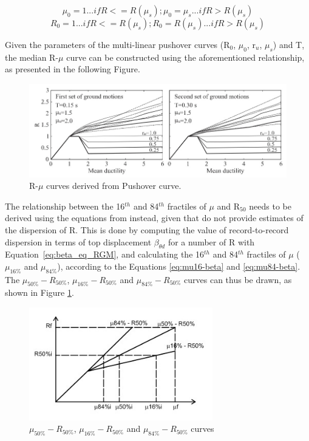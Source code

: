 \begin{equation}
\mu_0= 1 ... if R<=R(\mu_s); \mu_0 = \mu_s ... if R>R(\mu_s)
\end{equation}
\begin{equation}
R_0= 1 ... if R<=R(\mu_s); R_0 = R(\mu_s) ... if R>R(\mu_s)
\end{equation}

Given the parameters of the multi-linear pushover curves (R$_{0}$, $\mu_{0}$, r$_{u}$, $\mu_s$) and T, the median R-$\mu$ curve can be constructed using the aforementioned relationship, as presented in the following Figure.

\begin{figure}[!htbp]
\centering
\includegraphics[width=15cm]{figures/DF_R-mu.jpg}
\caption{R-$\mu$ curves derived from Pushover curve.}
\end{figure}

The relationship between the 16$^{th}$ and 84$^{th}$ fractiles of $\mu$ and R$_{50}$ needs to be derived using the equations from \citep{RuizGarciaMiranda2007} instead, given that \citep{DolsekFajfar2004} do not provide estimates of the dispersion of R. This is done by computing the value of record-to-record dispersion in terms of top displacement $\beta_{\theta d}$ for a number of R with Equation~\ref{eq:beta_eq_RGM}, and calculating the 16$^{th}$ and 84$^{th}$ fractiles of $\mu$ ($\mu_{16\%}$ and $\mu_{84\%}$), according to the Equations \ref{eq:mu16-beta} and \ref{eq:mu84-beta}. The $\mu_{50\%}-R_{50\%}$, $\mu_{16\%}-R_{50\%}$ and $\mu_{84\%}-R_{50\%}$ curves can thus be drawn, as shown in Figure \ref{fig:R-mu}.

\begin{figure}[!htbp]
\centering
\includegraphics[width=8cm]{figures/Rmu.jpg}
\caption{$\mu_{50\%}-R_{50\%}$, $\mu_{16\%}-R_{50\%}$ and $\mu_{84\%}-R_{50\%}$ curves}
\label{fig:R-mu}
\end{figure}

